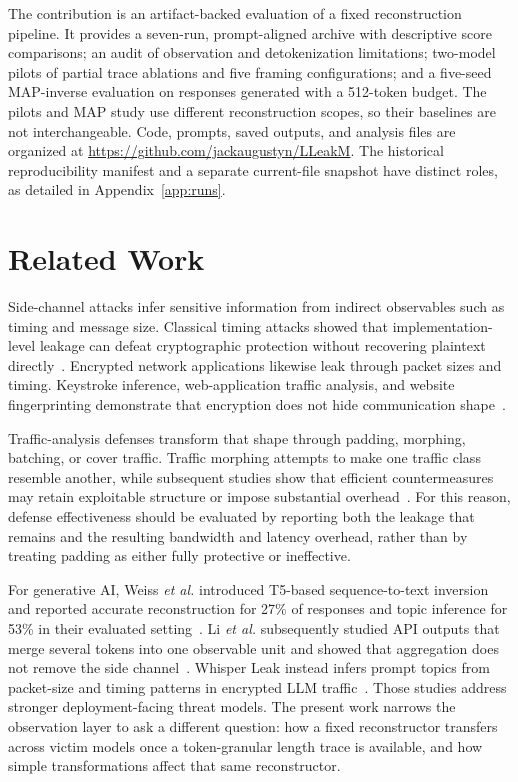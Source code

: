 \documentclass[electronics,article,submit,pdftex,moreauthors]{Definitions/mdpi}
\begin{document}
The contribution is an artifact-backed evaluation of a fixed reconstruction pipeline. It provides a seven-run, prompt-aligned archive with descriptive score comparisons; an audit of observation and detokenization limitations; two-model pilots of partial trace ablations and five framing configurations; and a five-seed MAP-inverse evaluation on responses generated with a 512-token budget. The pilots and MAP study use different reconstruction scopes, so their baselines are not interchangeable. Code, prompts, saved outputs, and analysis files are organized at \url{https://github.com/jackaugustyn/LLeakM}. The historical reproducibility manifest and a separate current-file snapshot have distinct roles, as detailed in Appendix~\ref{app:runs}.

\section{Related Work}
Side-channel attacks infer sensitive information from indirect observables such as timing and message size. Classical timing attacks showed that implementation-level leakage can defeat cryptographic protection without recovering plaintext directly~\cite{kocher1996timing}. Encrypted network applications likewise leak through packet sizes and timing. Keystroke inference, web-application traffic analysis, and website fingerprinting demonstrate that encryption does not hide communication shape~\cite{song2001timing,chen2010sidechannel,cai2012touching,sirinam2018deep}.

Traffic-analysis defenses transform that shape through padding, morphing, batching, or cover traffic. Traffic morphing attempts to make one traffic class resemble another, while subsequent studies show that efficient countermeasures may retain exploitable structure or impose substantial overhead~\cite{wright2009morphing,dyer2012peekaboo}. For this reason, defense effectiveness should be evaluated by reporting both the leakage that remains and the resulting bandwidth and latency overhead, rather than by treating padding as either fully protective or ineffective.

For generative AI, Weiss \emph{et al.} introduced T5-based sequence-to-text inversion and reported accurate reconstruction for 27\% of responses and topic inference for 53\% in their evaluated setting~\cite{weiss2024prompt}. Li \emph{et al.} subsequently studied API outputs that merge several tokens into one observable unit and showed that aggregation does not remove the side channel~\cite{li2026length}. Whisper Leak instead infers prompt topics from packet-size and timing patterns in encrypted LLM traffic~\cite{whisperleak2025}. Those studies address stronger deployment-facing threat models. The present work narrows the observation layer to ask a different question: how a fixed reconstructor transfers across victim models once a token-granular length trace is available, and how simple transformations affect that same reconstructor.
\end{document}
